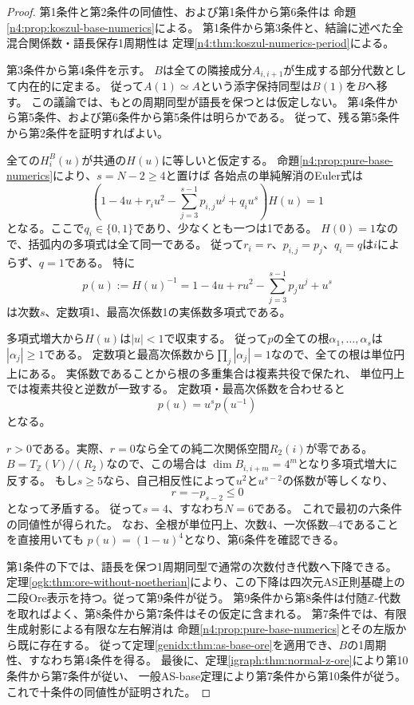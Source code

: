 \documentclass[11pt,a4paper]{ltjsarticle}
\theoremstyle{definition}
\begin{document}
\begin{proof}
第1条件と第2条件の同値性、および第1条件から第6条件は
命題\ref{n4:prop:koszul-base-numerics}による。
第1条件から第3条件と、結論に述べた全混合関係数・語長保存1周期性は
定理\ref{n4:thm:koszul-numerics-period}による。

第3条件から第4条件を示す。
$B$は全ての隣接成分$A_{i,i+1}$が生成する部分代数として内在的に定まる。
従って$A(1)\simeq A$という添字保持同型は$B(1)$を$B$へ移す。
この議論では、もとの周期同型が語長を保つとは仮定しない。
第4条件から第5条件、および第6条件から第5条件は明らかである。
従って、残る第5条件から第2条件を証明すればよい。

全ての$H_i^B(u)$が共通の$H(u)$に等しいと仮定する。
命題\ref{n4:prop:pure-base-numerics}により、$s=N-2\ge4$と置けば
各始点の単純解消のEuler式は
\[
\left(1-4u+r_i u^2-\sum_{j=3}^{s-1}p_{i,j}u^j+q_i u^s\right)H(u)=1
\]
となる。ここで$q_i\in\{0,1\}$であり、少なくとも一つは1である。
$H(0)=1$なので、括弧内の多項式は全て同一である。
従って$r_i=r$、$p_{i,j}=p_j$、$q_i=q$は$i$によらず、$q=1$である。
特に
\[
p(u):=H(u)^{-1}
=1-4u+ru^2-\sum_{j=3}^{s-1}p_j u^j+u^s
\]
は次数$s$、定数項1、最高次係数1の実係数多項式である。

多項式増大から$H(u)$は$|u|<1$で収束する。
従って$p$の全ての根$\alpha_1,\ldots,\alpha_s$は$|\alpha_j|\ge1$である。
定数項と最高次係数から$\prod_j|\alpha_j|=1$なので、全ての根は単位円上にある。
実係数であることから根の多重集合は複素共役で保たれ、
単位円上では複素共役と逆数が一致する。
定数項・最高次係数を合わせると
\[
p(u)=u^sp(u^{-1})
\]
となる。

$r>0$である。実際、$r=0$なら全ての純二次関係空間$R_2(i)$が零である。
$B=T_{\mathbb Z}(V)/(R_2)$なので、この場合は
$\dim B_{i,i+m}=4^m$となり多項式増大に反する。
もし$s\ge5$なら、自己相反性によって$u^2$と$u^{s-2}$の係数が等しくなり、
\[
r=-p_{s-2}\le0
\]
となって矛盾する。
従って$s=4$、すなわち$N=6$である。
これで最初の六条件の同値性が得られた。
なお、全根が単位円上、次数4、一次係数$-4$であることを直接用いても
$p(u)=(1-u)^4$となり、第6条件を確認できる。

第1条件の下では、語長を保つ1周期同型で通常の次数付き代数へ下降できる。
定理\ref{ogk:thm:ore-without-noetherian}により、この下降は四次元AS正則基礎上の
二段Ore表示を持つ。従って第9条件が従う。
第9条件から第8条件は付随$\mathbb Z$-代数を取ればよく、第8条件から第7条件はその仮定に含まれる。
第7条件では、有限生成射影による有限な左右解消は
命題\ref{n4:prop:pure-base-numerics}とその左版から既に存在する。
従って定理\ref{genidx:thm:as-base-ore}を適用でき、$B$の1周期性、すなわち第4条件を得る。
最後に、定理\ref{igraph:thm:normal-z-ore}により第10条件から第7条件が従い、
一般AS-base定理により第7条件から第10条件が従う。
これで十条件の同値性が証明された。
\end{proof}
\end{document}
